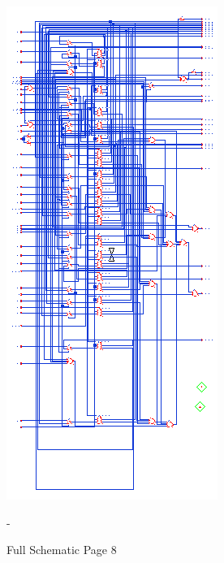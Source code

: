 \documentclass[11pt]{article}
\begin{document}
		
		\begin{figure}[H] 
			\centering 
			\includegraphics[width=\textwidth,height=\dimexpr\textheight-4\baselineskip-\abovecaptionskip-\belowcaptionskip\relax,keepaspectratio]{"Pictures/Full Schematic Page 8"}
			\caption{Full Schematic Page 8} 
		-	\label{fig:Full-Schematic-Page-8} 
		\end{figure}
		
\end{document}
